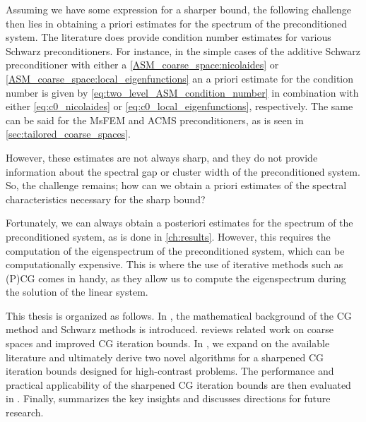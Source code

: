 Assuming we have some expression for a sharper bound, the following challenge then lies in obtaining a priori estimates for the spectrum of the preconditioned system. The literature does provide condition number estimates for various Schwarz preconditioners. For instance, in the simple cases of the additive Schwarz preconditioner with either a \ref{ASM_coarse_space:nicolaides} or \ref{ASM_coarse_space:local_eigenfunctions} an a priori estimate for the condition number is given by \cref{eq:two_level_ASM_condition_number} in combination with either \cref{eq:c0_nicolaides} or \cref{eq:c0_local_eigenfunctions}, respectively. The same can be said for the MsFEM and ACMS preconditioners, as is seen in \cref{sec:tailored_coarse_spaces}.

However, these estimates are not always sharp, and they do not provide information about the spectral gap or cluster width of the preconditioned system. So, the challenge remains; how can we obtain a priori estimates of the spectral characteristics necessary for the sharp bound?

Fortunately, we can always obtain a posteriori estimates for the spectrum of the preconditioned system, as is done in \cref{ch:results}. However, this requires the computation of the eigenspectrum of the preconditioned system, which can be computationally expensive. This is where the use of iterative methods such as (P)CG comes in handy, as they allow us to compute the eigenspectrum during the solution of the linear system.

This thesis is organized as follows. In , the mathematical background of the CG method and Schwarz methods is introduced.  reviews related work on coarse spaces and improved CG iteration bounds. In , we expand on the available literature and ultimately derive two novel algorithms for a sharpened CG iteration bounds designed for high-contrast problems. The performance and practical applicability of the sharpened CG iteration bounds are then evaluated in . Finally,  summarizes the key insights and discusses directions for future research.